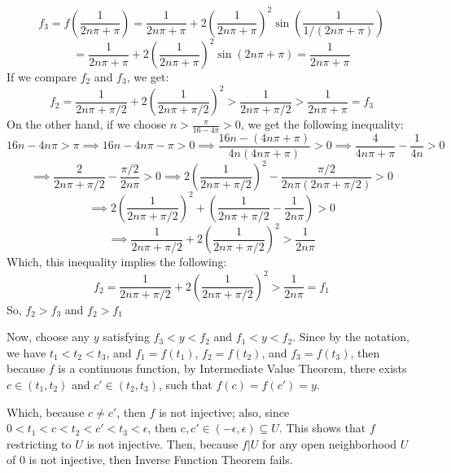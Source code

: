 \documentclass{article}
\begin{document}
$$f_3 = f\left(\frac{1}{2n\pi +\pi}\right)=\frac{1}{2n\pi +\pi}+2\left(\frac{1}{2n\pi +\pi}\right)^2\sin\left(\frac{1}{1/(2n\pi +\pi)}\right)$$
$$=\frac{1}{2n\pi +\pi}+2\left(\frac{1}{2n\pi +\pi}\right)^2\sin(2n\pi+\pi)=\frac{1}{2n\pi +\pi}$$
If we compare $f_2$ and $f_3$, we get:
$$f_2=\frac{1}{2n\pi +\pi/2}+2\left(\frac{1}{2n\pi +\pi/2}\right)^2>\frac{1}{2n\pi +\pi/2}>\frac{1}{2n\pi +\pi}=f_3$$
On the other hand, if we choose $n>\frac{\pi}{16-4\pi}>0$, we get the following inequality:
$$16n-4n\pi > \pi\implies 16n -4n\pi -\pi>0\implies \frac{16n -(4n\pi +\pi)}{4n(4n\pi +\pi)}>0 \implies \frac{4}{4n\pi +\pi}-\frac{1}{4n}>0 $$
$$\implies \frac{2}{2n\pi + \pi/2}-\frac{\pi/2}{2n\pi}>0 \implies 2\left(\frac{1}{2n\pi+\pi/2}\right)^2-\frac{\pi/2}{2n\pi(2n\pi+\pi/2)}>0$$
$$\implies 2\left(\frac{1}{2n\pi+\pi/2}\right)^2+\left(\frac{1}{2n\pi+\pi/2}-\frac{1}{2n\pi}\right)>0$$
$$\implies \frac{1}{2n\pi+\pi/2}+2\left(\frac{1}{2n\pi+\pi/2}\right)^2>\frac{1}{2n\pi}$$
Which, this inequality implies the following:
$$f_2 = \frac{1}{2n\pi+\pi/2}+2\left(\frac{1}{2n\pi+\pi/2}\right)^2 >\frac{1}{2n\pi}=f_1$$
So, $f_2>f_3$ and $f_2>f_1$

Now, choose any $y$ satisfying $f_3<y<f_2$ and $f_1<y<f_2$. Since by the notation, we have $t_1<t_2<t_3$, and $f_1=f(t_1)$, $f_2=f(t_2)$, and $f_3=f(t_3)$,
then because $f$ is a continuous function, by Intermediate Value Theorem, there exists $c\in (t_1,t_2)$ and $c'\in (t_2,t_3)$, such that $f(c)=f(c')=y$.

Which, because $c\neq c'$, then $f$ is not injective; also, since $0<t_1<c<t_2<c'<t_3<\epsilon$, then $c,c'\in (-\epsilon,\epsilon)\subseteq U$.
This shows that $f$ restricting to $U$ is not injective. Then, because $f|U$ for any open neighborhood $U$ of $0$ is not injective, then Inverse Function Theorem fails.

\break
\end{document}
